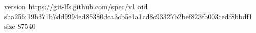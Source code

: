 version https://git-lfs.github.com/spec/v1
oid sha256:19b371b7dd9994ed85380dca3cb5e1a1cd8c93327b2bef823fb003cedf8bbdf1
size 87540
